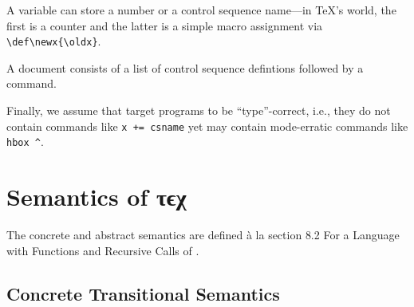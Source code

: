 \documentclass[a4paper]{article}
\newcommand*{\tex}{τϵχ}
\begin{document}
A variable can store a number or a control sequence name---in \TeX's world, the first is a counter and the latter is a simple macro assignment via \verb/\def\newx{\oldx}/.

A document consists of a list of control sequence defintions followed by a command.

Finally, we assume that target programs to be ``type''-correct, i.e., they do not contain commands like \verb/x += csname/ yet may contain mode-erratic commands like \verb/hbox ^/.

\section{Semantics of \tex}
The concrete and abstract semantics are defined \`a la section \textsf{8.2 For a Language with Functions and Recursive Calls} of \cite{itsa}.
\subsection{Concrete Transitional Semantics}
\end{document}
